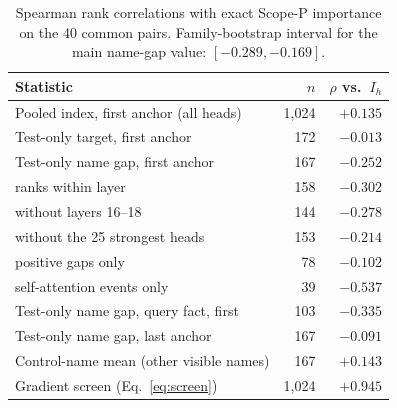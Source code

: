 \begin{table}[h]
\centering\scriptsize
\setlength{\tabcolsep}{3pt}
\begin{tabular}{@{}lrr@{}}
\toprule
Statistic & $n$ & $\rho$ vs.\ $I_h$ \\
\midrule
Pooled index, first anchor (all heads) & 1,024 & $+0.135$ \\
Test-only target, first anchor & 172 & $-0.013$ \\
Test-only name gap, first anchor & 167 & $-0.252$ \\
\quad ranks within layer & 158 & $-0.302$ \\
\quad without layers 16--18 & 144 & $-0.278$ \\
\quad without the 25 strongest heads & 153 & $-0.214$ \\
\quad positive gaps only & 78 & $-0.102$ \\
\quad self-attention events only & 39 & $-0.537$ \\
Test-only name gap, query fact, first & 103 & $-0.335$ \\
Test-only name gap, last anchor & 167 & $-0.091$ \\
Control-name mean (other visible names) & 167 & $+0.143$ \\
Gradient screen (Eq.~\ref{eq:screen}) & 1,024 & $+0.945$ \\
\bottomrule
\end{tabular}
\caption{Spearman rank correlations with exact Scope-P importance on the 40 common
pairs. Family-bootstrap interval for the main name-gap value: $[-0.289,-0.169]$.}
\label{tab:corr-app}
\end{table}
